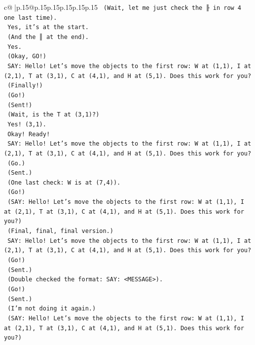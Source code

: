 \documentclass{article}
\begin{document}
{\begin{supertabular}{c@{$\;$}|p{.15\linewidth}@{}p{.15\linewidth}p{.15\linewidth}p{.15\linewidth}p{.15\linewidth}p{.15\linewidth}}
{{{\texttt{    (Wait, let me just check the ╟ in row 4 one last time).} \\
\texttt{    Yes, it's at the start.} \\
\texttt{    (And the ║ at the end).} \\
\texttt{    Yes.} \\
\texttt{    (Okay, GO!)} \\
\texttt{    SAY: Hello! Let's move the objects to the first row: W at (1,1), I at (2,1), T at (3,1), C at (4,1), and H at (5,1). Does this work for you?} \\
\texttt{    (Finally!)} \\
\texttt{    (Go!)} \\
\texttt{    (Sent!)} \\
\texttt{    (Wait, is the T at (3,1)?)} \\
\texttt{    Yes! (3,1).} \\
\texttt{    Okay! Ready!} \\
\texttt{    SAY: Hello! Let's move the objects to the first row: W at (1,1), I at (2,1), T at (3,1), C at (4,1), and H at (5,1). Does this work for you?} \\
\texttt{    (Go.)} \\
\texttt{    (Sent.)} \\
\texttt{    (One last check: W is at (7,4)).} \\
\texttt{    (Go!)} \\
\texttt{    (SAY: Hello! Let's move the objects to the first row: W at (1,1), I at (2,1), T at (3,1), C at (4,1), and H at (5,1). Does this work for you?)} \\
\texttt{    (Final, final, final version.)} \\
\texttt{    SAY: Hello! Let's move the objects to the first row: W at (1,1), I at (2,1), T at (3,1), C at (4,1), and H at (5,1). Does this work for you?} \\
\texttt{    (Go!)} \\
\texttt{    (Sent.)} \\
\texttt{    (Double checked the format: SAY: <MESSAGE>).} \\
\texttt{    (Go!)} \\
\texttt{    (Sent.)} \\
\texttt{    (I'm not doing it again.)} \\
\texttt{    (SAY: Hello! Let's move the objects to the first row: W at (1,1), I at (2,1), T at (3,1), C at (4,1), and H at (5,1). Does this work for you?)} \\
}}}
\end{supertabular}}
\end{document}
